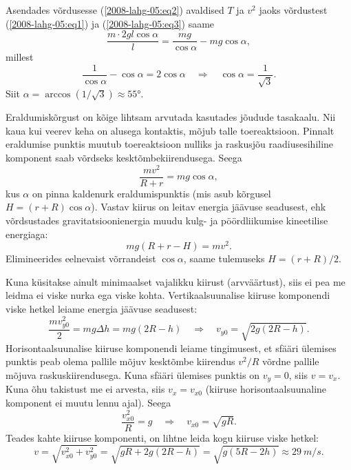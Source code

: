 \documentclass[10pt]{article}
\begin{document}
{Asendades võrdusesse (\ref{2008-lahg-05:eq2}) avaldised $T$ ja $v^2$
jaoks võrdustest (\ref{2008-lahg-05:eq1}) ja (\ref{2008-lahg-05:eq3}) saame
\[
\frac{m \cdot 2 g l \cos \alpha}{l}=\frac{m g}{\cos \alpha}-m g \cos \alpha,
\]
millest
\[
\frac{1}{\cos \alpha}-\cos \alpha=2 \cos \alpha \quad \Rightarrow\quad \cos \alpha=\frac{1}{\sqrt{3}}.
\]
Siit $\alpha = \arccos \left( 1/ \sqrt 3\right) \approx \ang{55}$.
\probend
\bigskip


\solu
Eraldumiskõrgust on kõige lihtsam arvutada kasutades jõudude tasakaalu. 
Nii kaua kui veerev keha on alusega kontaktis, mõjub talle toereaktsioon. 
Pinnalt eraldumise punktis muutub toereaktsioon nulliks ja raskusjõu raadiusesihiline 
komponent saab võrdseks kesktõmbekiirendusega. Seega
\[
\frac{mv^2}{R+r}=mg\cos\alpha,
\]
kus $\alpha$ on pinna kaldenurk eraldumispunktis (mis asub kõrgusel $H=(r+R)\cos\alpha$). 
Vastav kiirus on leitav energia jäävuse seadusest, ehk
võrdsustades gravitatsioonienergia muudu kulg- ja pöördliikumise kineetilise energiaga:
\[
mg(R+r-H)=mv^2.
\]
Elimineerides eelnevaist võrrandeist $\cos\alpha$, saame tulemuseks $H=(r+R)/2$.
\probend
\bigskip


\solu
Kuna küsitakse ainult minimaalset vajalikku kiirust (arvväärtust), siis ei pea me leidma ei viske nurka ega viske kohta. Vertikaalsuunalise kiiruse komponendi viske hetkel leiame energia jäävuse seadusest:
\[
\frac{m v_{y 0}^{2}}{2}=m g \Delta h=m g(2 R-h) \quad \Rightarrow \quad v_{y 0}=\sqrt{2 g(2 R-h)}.
\]
Horisontaalsuunalise kiiruse komponendi leiame tingimusest, et sfääri ülemises punktis peab olema pallile mõjuv kesktõmbe kiirendus $v^2/R$ võrdne pallile mõjuva raskuskiirendusega. Kuna sfääri ülemises punktis on $v_y = 0$, siis $v = v_x$. Kuna õhu takistust me ei arvesta, siis $v_x = v_{x0}$ (kiiruse horisontaalsuunaline komponent ei muutu lennu ajal). Seega
\[
\frac{v_{x 0}^{2}}{R}=g \quad \Rightarrow \quad v_{x 0}=\sqrt{g R}.
\]
Teades kahte kiiruse komponenti, on lihtne leida kogu kiiruse viske hetkel:
\[
v=\sqrt{v_{x 0}^{2}+v_{y 0}^{2}}=\sqrt{g R+2 g(2 R-h)}=\sqrt{g(5 R-2 h)} \approx \SI{29}{m/s}.
\]

\vspace{0.5\baselineskip}

}
\end{document}
